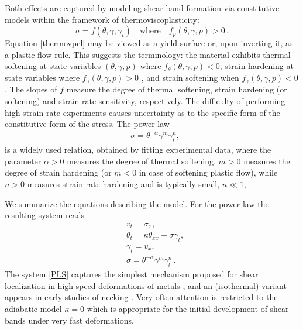 \documentclass[a4paper,11pt]{article}
\newcommand{\tht}{\theta}
\newcommand{\ga}{\alpha}
\theoremstyle{remark}
\begin{document}
Both effects are captured by modeling shear band formation via constitutive models
within the framework  of thermoviscoplasticity:
\begin{equation}
\label{thermovpcl}
\sigma = f(\theta, \gamma, \gamma_t) \quad \mbox{where} \quad f_p (\theta, \gamma, p)  > 0 \, .
\end{equation}
Equation \eqref{thermovpcl} may be viewed as a yield surface or,  upon inverting it, as a plastic flow rule. This suggests the terminology:
the material exhibits thermal softening at state variables $(\theta, \gamma, p)$
where $f_\theta(\theta, \gamma, p) < 0$, strain hardening at state variables where $f_\gamma(\theta, \gamma, p) > 0$ , and strain softening when $f_\gamma(\theta, \gamma, p) < 0$.
The slopes of $f$ measure the degree of thermal softening, strain hardening (or softening)
and strain-rate sensitivity, respectively.
The difficulty of performing high strain-rate experiments causes uncertainty as to the specific form of the constitutive form of the stress.  The power law
\begin{align}
&  \sigma =  \theta^{-\alpha} \gamma^{m} \gamma_{t}^{n},
 \label{PL0}
\end{align}
is a widely used relation, obtained by fitting experimental data, where the parameter $\alpha>0$
measures the degree of thermal softening, $m>0$ measures the degree of strain hardening (or $m<0$ in case of softening plastic flow), while $n>0$ measures strain-rate hardening and is typically small, $n \ll 1$, \cite{Clifton90}.



 We summarize the equations describing the model. For the power law
the resulting system reads
\begin{equation}
  \label{PLS}
  \begin{aligned}
    & v_{t} =  \sigma_{x},\\
    & \theta_{t} = \kappa \theta_{ x x}  +  \sigma \gamma_{t}, \\
    & \gamma_{t} = v_{x},  \\
    & \sigma  = \theta^{-\alpha}\gamma^{m}\gamma_{t}^n \, .
  \end{aligned}
\end{equation}
The system \eqref{PLS} captures the simplest mechanism proposed for shear localization in
high-speed deformations of metals \cite{ZH44, Clifton90}, and an (isothermal) variant appears in early studies of necking \cite{HN77}.
Very often attention is restricted to the adiabatic model $\kappa = 0$ which is appropriate for the initial
development of shear bands under very fast deformations.
\end{document}
